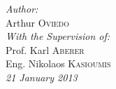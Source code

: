 \begin{titlepage}
\begin{center}
	\vspace{3mm}
	\vspace{3mm}
	\HRule 
	
	\emph{Author:} \\
	Arthur \textsc{Oviedo}\\
    \vspace{0.5cm}
    \emph{With the Supervision of:} \\   

    Prof. Karl \textsc{Aberer} \\   
    Eng. Nikolaos \textsc{Kasioumis}\\

	\vspace{0.5cm}
    \emph{21 January 2013}


\end{center}


\end{titlepage}

\newpage
\thispagestyle{empty}
\mbox{}